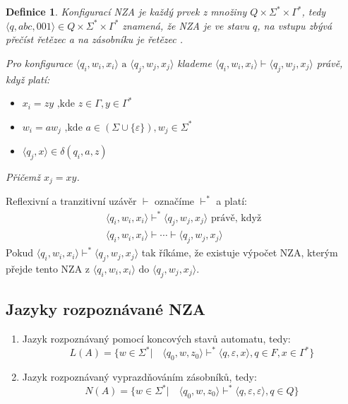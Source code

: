 \documentclass[10pt, a4paper, titlepage]{article}
\theoremstyle{note}
\newtheorem{definice}{Definice}
\begin{document}
\begin{definice}
Konfigurac\'i NZA je každ\'y prvek z množiny $Q \times \Sigma^* \times \Gamma^*$, tedy
$\langle q, abc, 001 \rangle \in Q \times \Sigma^* \times \Gamma^*$ znamená, že NZA je ve stavu $q$, na vstupu
zbývá přečíst řetězec  a na zásobníku je řetězec .

Pro konfigurace $\langle q_i, w_i, x_i \rangle \text{ a } \langle q_j, w_j, x_j \rangle$ klademe 
$\langle q_i, w_i, x_i \rangle \vdash \langle q_j, w_j, x_j \rangle$ právě, když platí:
\begin{itemize}
\item
$x_i = zy \text{ ,kde } z \in \Gamma, y \in \Gamma^*$

\item
$w_i = aw_j \text{ ,kde } a \in (\Sigma \cup \lbrace \varepsilon \rbrace), w_j \in \Sigma^*$

\item
$\langle q_j, x \rangle \in \delta(q_i, a, z)$
\end{itemize}
Přičemž $x_j = xy$.
\end{definice}

Reflexivní a tranzitivní uzávěr $\vdash$ označíme $\vdash^*$ a platí:
\begin{gather*}
\langle q_i, w_i, x_i \rangle \vdash^* \langle q_j, w_j, x_j \rangle \text{ právě, když} \\
\langle q_i, w_i, x_i \rangle \vdash \cdots \vdash \langle q_j, w_j, x_j \rangle
\end{gather*}
Pokud $\langle q_i, w_i, x_i \rangle \vdash^* \langle q_j, w_j, x_j \rangle$ tak říkáme, že existuje výpočet
NZA, kterým přejde tento NZA z $\langle q_i, w_i, x_i \rangle \text{ do } \langle q_j, w_j, x_j \rangle$.

\subsection{Jazyky rozpoznávané NZA}
\begin{enumerate}
\item
Jazyk rozpoznávaný pomocí koncových stavů automatu, tedy:
$$
L(A) = \lbrace w \in \Sigma^* | \quad \langle q_0, w, z_0 \rangle \vdash^* \langle q, \varepsilon, x \rangle, q \in F, x \in \Gamma^* \rbrace
$$

\item
Jazyk rozpoznávaný vyprazdňováním zásobníků, tedy:
$$
N(A) = \lbrace w \in \Sigma^* | \quad \langle q_0, w, z_0 \rangle \vdash^* \langle q, \varepsilon, \varepsilon \rangle, q \in Q \rbrace
$$
\end{enumerate}
\end{document}
